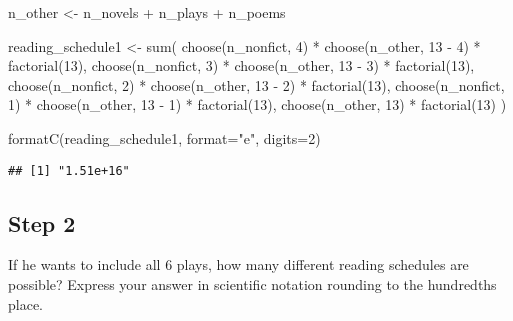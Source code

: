 \documentclass[
]{article}
\newenvironment{Shaded}{\begin{snugshade}}{\end{snugshade}}
\newcommand{\AttributeTok}[1]{\textcolor[rgb]{0.77,0.63,0.00}{#1}}
\newcommand{\DecValTok}[1]{\textcolor[rgb]{0.00,0.00,0.81}{#1}}
\newcommand{\FunctionTok}[1]{\textcolor[rgb]{0.00,0.00,0.00}{#1}}
\newcommand{\NormalTok}[1]{#1}
\newcommand{\OtherTok}[1]{\textcolor[rgb]{0.56,0.35,0.01}{#1}}
\newcommand{\SpecialCharTok}[1]{\textcolor[rgb]{0.00,0.00,0.00}{#1}}
\newcommand{\StringTok}[1]{\textcolor[rgb]{0.31,0.60,0.02}{#1}}
\begin{document}
\begin{Shaded}
\begin{Highlighting}[]
\NormalTok{n\_other }\OtherTok{\textless{}{-}}\NormalTok{ n\_novels }\SpecialCharTok{+}\NormalTok{ n\_plays }\SpecialCharTok{+}\NormalTok{ n\_poems}

\NormalTok{reading\_schedule1 }\OtherTok{\textless{}{-}} \FunctionTok{sum}\NormalTok{(}
  \FunctionTok{choose}\NormalTok{(n\_nonfict, }\DecValTok{4}\NormalTok{) }\SpecialCharTok{*} \FunctionTok{choose}\NormalTok{(n\_other, }\DecValTok{13} \SpecialCharTok{{-}} \DecValTok{4}\NormalTok{) }\SpecialCharTok{*} \FunctionTok{factorial}\NormalTok{(}\DecValTok{13}\NormalTok{),}
  \FunctionTok{choose}\NormalTok{(n\_nonfict, }\DecValTok{3}\NormalTok{) }\SpecialCharTok{*} \FunctionTok{choose}\NormalTok{(n\_other, }\DecValTok{13} \SpecialCharTok{{-}} \DecValTok{3}\NormalTok{) }\SpecialCharTok{*} \FunctionTok{factorial}\NormalTok{(}\DecValTok{13}\NormalTok{),}
  \FunctionTok{choose}\NormalTok{(n\_nonfict, }\DecValTok{2}\NormalTok{) }\SpecialCharTok{*} \FunctionTok{choose}\NormalTok{(n\_other, }\DecValTok{13} \SpecialCharTok{{-}} \DecValTok{2}\NormalTok{) }\SpecialCharTok{*} \FunctionTok{factorial}\NormalTok{(}\DecValTok{13}\NormalTok{),}
  \FunctionTok{choose}\NormalTok{(n\_nonfict, }\DecValTok{1}\NormalTok{) }\SpecialCharTok{*} \FunctionTok{choose}\NormalTok{(n\_other, }\DecValTok{13} \SpecialCharTok{{-}} \DecValTok{1}\NormalTok{) }\SpecialCharTok{*} \FunctionTok{factorial}\NormalTok{(}\DecValTok{13}\NormalTok{),}
  \FunctionTok{choose}\NormalTok{(n\_other, }\DecValTok{13}\NormalTok{) }\SpecialCharTok{*} \FunctionTok{factorial}\NormalTok{(}\DecValTok{13}\NormalTok{)}
\NormalTok{)}

\FunctionTok{formatC}\NormalTok{(reading\_schedule1, }\AttributeTok{format=}\StringTok{"e"}\NormalTok{, }\AttributeTok{digits=}\DecValTok{2}\NormalTok{)}
\end{Highlighting}
\end{Shaded}

\begin{verbatim}
## [1] "1.51e+16"
\end{verbatim}

\hypertarget{step-2-1}{%
\subsection{Step 2}\label{step-2-1}}

If he wants to include all 6 plays, how many different reading schedules
are possible? Express your answer in scientific notation rounding to the
hundredths place.
\end{document}
